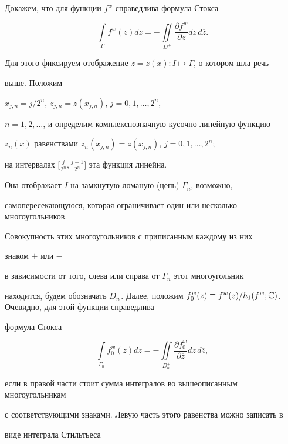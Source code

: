 Докажем, что для функции $f^w$ справедлива формула Стокса


\begin{equation}


\int\limits_{\Gamma}f^{w}(z)dz = -\iint\limits_{D^+}


\frac{\partial f^w}{\partial\overline z}dz\,d\overline z.


\end{equation}


Для этого фиксируем отображение $z=z(x):I\mapsto\Gamma$, о котором шла речь


выше. Положим


$x_{j,n} = j/2^{n}$, $z_{j,n} = z(x_{j,n})$, $j = 0,1,\dotsc,2^n$,


$n = 1,2,\dotsc$, и определим комплекснозначную кусочно-линейную функцию


$z_{n}(x)$ равенствами $z_{n}(x_{j,n}) = z(x_{j,n})$, $j=0,1,\dotsc,2^n$;


на интервалах $\big[\frac{j}{2^{n}},\frac{j+1}{2^n}\big]$ эта функция линейна.


Она отображает $I$ на замкнутую ломаную (цепь) $\Gamma_n$, возможно,


самопересекающуюся, которая ограничивает один или несколько многоугольников.


Совокупность этих многоугольников с приписанным каждому из них


знаком $+$ или $-$


в зависимости от того, слева или справа от $\Gamma_n$ этот многоугольник


находится, будем обозначать $D^+_n$. Далее, положим $f^{w}_{0}(z)\equiv


f^{w}(z)/h_{1}(f^w; {\Bbb C})$. Очевидно, для этой функции справедлива


формула Стокса


\begin{equation}


\int\limits_{\Gamma_n}f^{w}_{0}(z)dz = -\iint\limits_{D^+_n}


\frac{\partial f^w_0}{\partial\overline z}dz\,d\overline z,


\end{equation}


если в правой части стоит сумма интегралов во вышеописанным многоугольникам


с соответствующими знаками. Левую часть этого равенства можно записать в


виде интеграла Стильтьеса


